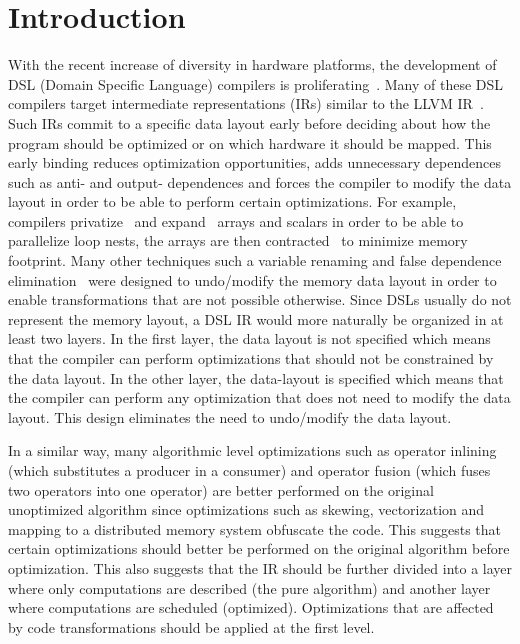
\section{Introduction}
\label{sec:intro}

With the recent increase of diversity in hardware platforms, the development of DSL (Domain Specific Language) compilers is proliferating~\cite{halide_12,DBLP:conf/pldi/Ragan-KelleyBAPDA13,diedrot_pldi12,DBLP:journals/toms/AlnaesLORW14,polymage,bezanson2017julia,tensorflow}.
Many of these DSL compilers target intermediate representations (IRs) similar to the LLVM IR~\cite{llvm}.  Such IRs commit to a specific data layout early before deciding about how the program should be optimized or on which hardware it should be mapped.  This early binding reduces optimization opportunities, adds unnecessary dependences such as anti- and output- dependences and forces the compiler to modify the data layout in order to be able to perform certain optimizations.  For example, compilers privatize~\cite{gupta1997privatization,autoPrivatPeng,li_array_1992} and expand~\cite{feautrier_array_1988,midkiff_automatic_2012,maydan_array-data_1993} arrays and scalars in order to be able to parallelize loop nests, the arrays are then contracted~\cite{lefebvre_automatic_1998,Qui00,Darte_contraction_2005} to minimize memory footprint.  Many other techniques such a variable renaming and false dependence elimination~\cite{Baghdadi:fdeps,Mehta:2016:VL:2988523.2963101} were designed to undo/modify the memory data layout in order to enable transformations that are not possible otherwise.  Since DSLs usually do not represent the memory layout, a DSL IR would more naturally be organized in at least two layers.  In the first layer, the data layout is not specified which means that the compiler can perform optimizations that should not be constrained by the data layout. In the other layer, the data-layout is specified which means that the compiler can perform any optimization that does not need to modify the data layout.  This design eliminates the need to undo/modify the data layout.

In a similar way, many algorithmic level optimizations such as operator inlining (which substitutes a producer in a consumer) and operator fusion (which fuses two operators into one operator) are better performed on the original unoptimized algorithm since optimizations such as skewing, vectorization and mapping to a distributed memory system obfuscate the code.
This suggests that certain optimizations should better be performed on the original algorithm before optimization.  This also suggests that the IR should be further divided into a layer where only computations are described (the pure algorithm) and another layer where computations are scheduled (optimized). Optimizations that are affected by code transformations should be applied at the first level.

